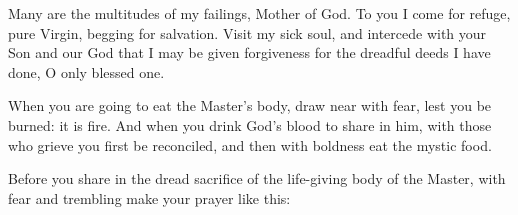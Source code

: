  \theotokion

Many are the multitudes of my failings, Mother of God. To you I come for refuge, pure Virgin, begging for salvation. Visit my sick soul, and intercede with your Son and our God that I may be given forgiveness for the dreadful deeds I have done, O only blessed one.




When you are going to eat the Master's body, draw near with fear, lest you be burned: it is fire. And when you drink God's blood to share in him, with those who grieve you first be reconciled, and then with boldness eat the mystic food.


Before you share in the dread sacrifice of the life-giving body of the Master, with fear and trembling make your prayer like this:


